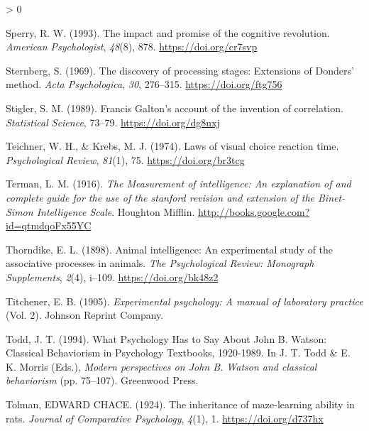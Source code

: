 \documentclass[
  oneside,
  12pt]{crumpbook}
\newlength{\cslhangindent}
\newenvironment{CSLReferences}[2] %
 {%
  \setlength{\parindent}{0pt}
  \ifodd #1 \everypar{\setlength{\hangindent}{\cslhangindent}}\ignorespaces\fi
  \ifnum #2 > 0
  \setlength{\parskip}{#2\baselineskip}
  \fi
 }%
 {}
\begin{document}
\begin{CSLReferences}{1}{0}
\leavevmode\hypertarget{ref-sperryImpactPromiseCognitive1993}{}%
Sperry, R. W. (1993). The impact and promise of the cognitive revolution. \emph{American Psychologist}, \emph{48}(8), 878. \url{https://doi.org/cr7svp}

\leavevmode\hypertarget{ref-sternbergDiscoveryProcessingStages1969a}{}%
Sternberg, S. (1969). The discovery of processing stages: {Extensions} of {Donders}' method. \emph{Acta Psychologica}, \emph{30}, 276--315. \url{https://doi.org/ftg756}

\leavevmode\hypertarget{ref-stiglerFrancisGaltonAccount1989}{}%
Stigler, S. M. (1989). Francis {Galton}'s account of the invention of correlation. \emph{Statistical Science}, 73--79. \url{https://doi.org/dg8nxj}

\leavevmode\hypertarget{ref-teichnerLawsVisualChoice1974}{}%
Teichner, W. H., \& Krebs, M. J. (1974). Laws of visual choice reaction time. \emph{Psychological Review}, \emph{81}(1), 75. \url{https://doi.org/br3tcg}

\leavevmode\hypertarget{ref-termanMeasurementIntelligenceExplanation1916}{}%
Terman, L. M. (1916). \emph{The {Measurement} of intelligence: {An} explanation of and complete guide for the use of the stanford revision and extension of the {Binet}-{Simon Intelligence Scale}}. {Houghton Mifflin}. \url{http://books.google.com?id=qtmdqoFx55YC}

\leavevmode\hypertarget{ref-thorndikeAnimalIntelligenceExperimental1898}{}%
Thorndike, E. L. (1898). Animal intelligence: {An} experimental study of the associative processes in animals. \emph{The Psychological Review: Monograph Supplements}, \emph{2}(4), i--109. \url{https://doi.org/bk48z2}

\leavevmode\hypertarget{ref-titchenerExperimentalPsychologyManual1905}{}%
Titchener, E. B. (1905). \emph{Experimental psychology: {A} manual of laboratory practice} (Vol. 2). {Johnson Reprint Company}.

\leavevmode\hypertarget{ref-toddWhatPsychologyHas1994}{}%
Todd, J. T. (1994). What {Psychology Has} to {Say About John B}. {Watson}: {Classical Behaviorism} in {Psychology Textbooks}, 1920-1989. In J. T. Todd \& E. K. Morris (Eds.), \emph{Modern perspectives on {John B}. {Watson} and classical behaviorism} (pp. 75--107). {Greenwood Press}.

\leavevmode\hypertarget{ref-tolmanInheritanceMazelearningAbility1924}{}%
Tolman, EDWARD CHACE. (1924). The inheritance of maze-learning ability in rats. \emph{Journal of Comparative Psychology}, \emph{4}(1), 1. \url{https://doi.org/d737hx}


\end{CSLReferences}
\end{document}
